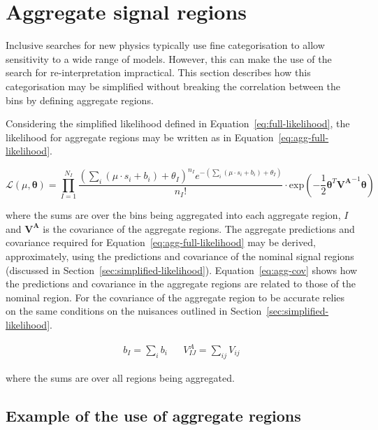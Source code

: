 \section{Aggregate signal regions}
\label{sec:aggregate-signal-regions}

Inclusive searches for new physics typically use fine categorisation to allow
sensitivity to a wide range of models. However, this can make the use
of the search for re-interpretation impractical. 
This section describes how this categorisation may be simplified without breaking the correlation 
between the bins by defining aggregate regions.

Considering the simplified likelihood defined in Equation~\ref{eq:full-likelihood},
the likelihood for aggregate regions may be written as in Equation~\ref{eq:agg-full-likelihood}.

\begin{equation}
\mathcal{L}(\mu, \boldsymbol{\theta}) =  \prod_{I=1}^{N_I} \dfrac{(\sum_{i}(\mu \cdot s_{i}+b_{i})+\theta_{I})^{n_{I}} e^{-(\sum_{i}(\mu \cdot s_{i}+b_{i})+\theta_{I})} }{n_{I}!} \cdot
\mathrm{exp}\left(-\dfrac{1}{2} \boldsymbol{\theta}^{T}\mathrm{\mathbf{V^A}}^{-1}\boldsymbol{\theta} \right)
\label{eq:agg-full-likelihood}
\end{equation}

where the sums are over the bins being aggregated into each aggregate region, $I$ and 
$\mathbf{V^A}$ is the covariance of the aggregate regions. The 
aggregate predictions and covariance required for Equation~\ref{eq:agg-full-likelihood}
may be derived, approximately, using the predictions and covariance
of the nominal signal regions (discussed in Section~\ref{sec:simplified-likelihood}).
Equation~\ref{eq:agg-cov} shows how the predictions and covariance in the aggregate
regions are related to those of the nominal region. 
For the covariance of the aggregate region to be accurate relies on the same conditions 
on the nuisances outlined in Section~\ref{sec:simplified-likelihood}. 

\begin{align}
b_{I} = \sum_i b_{i} && V^{A}_{IJ}=\sum_{ij}V_{ij}
\label{eq:agg-cov}
\end{align}

where the sums are over all regions being aggregated. 

\subsection{Example of the use of aggregate regions}
\label{sec:agg-toy}


